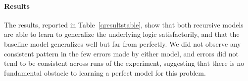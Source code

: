 %
%
\paragraph{Results} The results, reported in Table~\ref{qresultstable}, show that both recursive models are able to learn to generalize the underlying logic satisfactorily, and that the baseline model generalizes well but far from perfectly. We did not observe any consistent pattern in the few errors made by either model, and errors did not tend to be consistent across runs of the experiment, suggesting that there is no fundamental obstacle to learning a perfect model for this problem.

